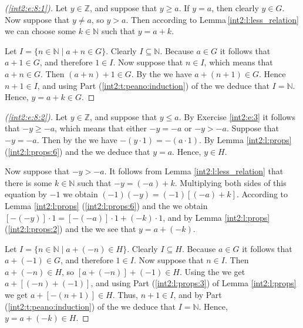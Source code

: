 \begin{proof}[(\ref{int2:e:8:1})]
	Let $y \in \mathbb{Z}$, and suppose that $y \geq a$. If $y = a$, then clearly $y \in G$. Now suppose that $y \not= a$, so $y > a$. Then according to Lemma\,\ref{int2:l:less_relation} we can choose some $k \in \mathbb{N}$ such that $y = a + k$.

	Let $I = \{ n \in \mathbb{N} \mid a + n \in G \}$. Clearly $I \subseteq \mathbb{N}$. Because $a \in G$ it follows that $a + 1 \in G$, and therefore $1 \in I$. Now suppose that $n \in I$, which means that $a + n \in G$. Then $(a + n) + 1 \in G$. By the  we have $a + (n + 1) \in G$. Hence $n + 1 \in I$, and using Part (\ref{int2:t:peano:induction}) of the  we deduce that $I = \mathbb{N}$. Hence, $y = a + k \in G$.
\end{proof}

\begin{proof}[(\ref{int2:e:8:2})]
	Let $y \in \mathbb{Z}$, and suppose that $y \leq a$. By Exercise \ref{int2:e:3} it follows that ${-y \geq -a}$, which means that either $-y = -a$ or $-y > -a$. Suppose that $-y = -a$. Then by the  we have $-(y \cdot 1) = -(a \cdot 1)$. By Lemma \ref{int2:l:props} (\ref{int2:l:props:6}) and the  we deduce that $y = a$. Hence, $y \in H$.

	Now suppose that $-y > -a$. It follows from Lemma \ref{int2:l:less_relation} that there is some ${k \in \mathbb{N}}$ such that $-y = (-a) + k$. Multiplying both sides of this equation by $-1$ we obtain ${(-1)(-y) = (-1)[(-a) + k]}$. According to Lemma \ref{int2:l:props} (\ref{int2:l:props:6}) and the  we obtain $[-(-y)] \cdot 1 = [-(-a)] \cdot 1 + (-k) \cdot 1$, and by Lemma \ref{int2:l:props} (\ref{int2:l:props:2}) and the  we see that $y = a + (-k)$.

	Let $I = \{ n \in \mathbb{N} \mid a + (-n) \in H \}$. Clearly $I \subseteq H$. Because $a \in G$ it follows that $a + (-1) \in G$, and therefore $1 \in I$. Now suppose that $n \in I$. Then $a + (-n) \in H$, so $[a + (-n)] + (-1) \in H$. Using the  we get $a + [(-n) + (-1)]$, and using Part (\ref{int2:l:props:3}) of Lemma \ref{int2:l:props} we get $a + [-(n + 1)] \in H$. Thus, $n + 1 \in I$, and by Part (\ref{int2:t:peano:induction}) of the  we deduce that $I = \mathbb{N}$. Hence, $y = a + (-k) \in H$.
\end{proof}
